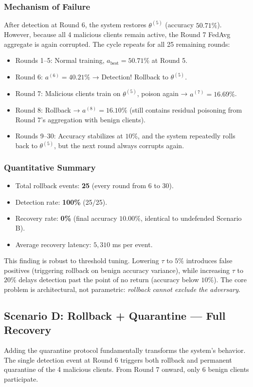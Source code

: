 \documentclass[conference]{IEEEtran}
\begin{document}
\subsubsection{Mechanism of Failure}
After detection at Round 6, the system restores $\theta^{(5)}$ (accuracy $50.71\%$). However, because all 4 malicious clients remain active, the Round 7 FedAvg aggregate is again corrupted. The cycle repeats for all 25 remaining rounds:

\begin{itemize}
    \item Rounds 1--5: Normal training, $a_{\text{best}} = 50.71\%$ at Round 5.
    \item Round 6: $a^{(6)} = 40.21\%$ → Detection! Rollback to $\theta^{(5)}$.
    \item Round 7: Malicious clients train on $\theta^{(5)}$, poison again → $a^{(7)} = 16.69\%$.
    \item Round 8: Rollback → $a^{(8)} = 16.10\%$ (still contains residual poisoning from Round 7's aggregation with benign clients).
    \item Rounds 9--30: Accuracy stabilizes at $10\%$, and the system repeatedly rolls back to $\theta^{(5)}$, but the next round always corrupts again.
\end{itemize}

\subsubsection{Quantitative Summary}
\begin{itemize}
    \item Total rollback events: \textbf{25} (every round from 6 to 30).
    \item Detection rate: \textbf{100\%} (25/25).
    \item Recovery rate: \textbf{0\%} (final accuracy $10.00\%$, identical to undefended Scenario B).
    \item Average recovery latency: $5{,}310$ ms per event.
\end{itemize}

This finding is robust to threshold tuning. Lowering $\tau$ to $5\%$ introduces false positives (triggering rollback on benign accuracy variance), while increasing $\tau$ to $20\%$ delays detection past the point of no return (accuracy below $10\%$). The core problem is architectural, not parametric: \emph{rollback cannot exclude the adversary}.

\subsection{Scenario D: Rollback + Quarantine — Full Recovery}
Adding the quarantine protocol fundamentally transforms the system's behavior. The single detection event at Round 6 triggers both rollback and permanent quarantine of the 4 malicious clients. From Round 7 onward, only 6 benign clients participate.
\end{document}
